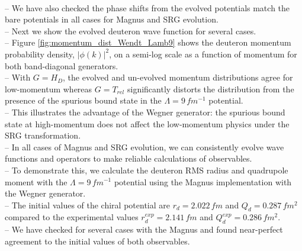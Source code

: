 \documentclass[preprintnumbers,floatfix,aps,prc,preprint,nofootinbib]{revtex4-1}
\begin{document}
\\
-- We have also checked the phase shifts from the evolved potentials match the bare potentials in all cases for Magnus and SRG evolution.
\\ 
-- Next we show the evolved deuteron wave function for several cases.
\\
-- Figure \ref{fig:momentum_dist_Wendt_Lamb9} shows the deuteron momentum probability density, $|\phi(k)|^2$, on a semi-log scale as a function of momentum for both band-diagonal generators.
\\
-- With $G=H_D$, the evolved and un-evolved momentum distributions agree for low-momentum whereas $G=T_{rel}$ significantly distorts the distribution from the presence of the spurious bound state in the $\Lambda=9 \, fm^{-1}$ potential.
\\
-- This illustrates the advantage of the Wegner generator: the spurious bound state at high-momentum does not affect the low-momentum physics under the SRG transformation.
\\
-- In all cases of Magnus and SRG evolution, we can consistently evolve wave functions and operators to make reliable calculations of observables.
\\
-- To demonstrate this, we calculate the deuteron RMS radius and quadrupole moment with the $\Lambda=9 \, fm^{-1}$ potential using the Magnus implementation with the Wegner generator.
\\
-- The initial values of the chiral potential are $r_d = 2.022 \, fm$ and $Q_d = 0.287 \, fm^2$ compared to the experimental values $r_d^{exp} = 2.141 \, fm$ and $Q_d^{exp} = 0.286 \, fm^2$. 
\\
-- We have checked for several cases with the Magnus and found near-perfect agreement to the initial values of both observables.
\\
\end{document}

